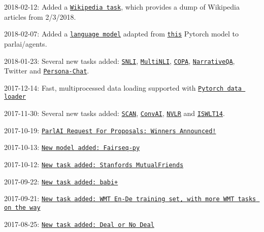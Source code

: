 2018-\/02-\/12\+: Added a \href{https://github.com/facebookresearch/ParlAI/blob/master/parlai/tasks/wikipedia/agents.py}{\tt Wikipedia task}, which provides a dump of Wikipedia articles from 2/3/2018.

2018-\/02-\/07\+: Added a \href{https://github.com/facebookresearch/ParlAI/blob/master/parlai/agents/language_model/language_model.py}{\tt language model} adapted from \href{https://github.com/pytorch/examples/tree/master/word_language_model}{\tt this} Pytorch model to parlai/agents.

2018-\/01-\/23\+: Several new tasks added\+: \href{https://nlp.stanford.edu/projects/snli/}{\tt S\+N\+LI}, \href{https://arxiv.org/abs/1704.05426}{\tt Multi\+N\+LI}, \href{http://people.ict.usc.edu/~gordon/copa.html}{\tt C\+O\+PA}, \href{https://github.com/deepmind/narrativeqa}{\tt Narrative\+QA}, Twitter and \href{https://arxiv.org/abs/1801.07243}{\tt Persona-\/\+Chat}.

2017-\/12-\/14\+: Fast, multiprocessed data loading supported with \href{https://github.com/facebookresearch/ParlAI/blob/master/parlai/core/pytorch_data_teacher.py}{\tt Pytorch data loader}

2017-\/11-\/30\+: Several new tasks added\+: \href{https://github.com/brendenlake/SCAN}{\tt S\+C\+AN}, \href{http://convai.io/data/}{\tt Conv\+AI}, \href{http://lic.nlp.cornell.edu/nlvr/}{\tt N\+V\+LR} and \href{http://wit3.fbk.eu}{\tt I\+S\+W\+L\+T14}.

2017-\/10-\/19\+: \href{https://research.fb.com/announcing-the-winners-of-the-facebook-parlai-research-awards/}{\tt Parl\+AI Request For Proposals\+: Winners Announced!}

2017-\/10-\/13\+: \href{https://github.com/facebookresearch/fairseq-py}{\tt New model added\+: Fairseq-\/py}

2017-\/10-\/12\+: \href{https://stanfordnlp.github.io/cocoa/}{\tt New task added\+: Stanford\textquotesingle{}s Mutual\+Friends}

2017-\/09-\/22\+: \href{https://www.researchgate.net/publication/319128941_Challenging_Neural_Dialogue_Models_with_Natural_Data_Memory_Networks_Fail_on_Incremental_Phenomena}{\tt New task added\+: babi+}

2017-\/09-\/21\+: \href{https://nlp.stanford.edu/projects/nmt/}{\tt New task added\+: W\+MT En-\/\+De training set, with more W\+MT tasks on the way}

2017-\/08-\/25\+: \href{https://github.com/facebookresearch/end-to-end-negotiator}{\tt New task added\+: Deal or No Deal}

